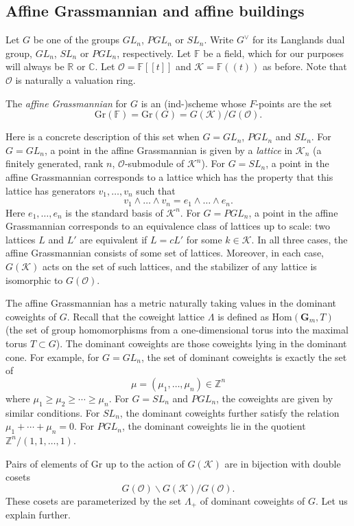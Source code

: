\documentclass[ALCO,ThmDefs,Unicode,epreuves]{cedram}
\newcommand{\F}{\mathbb{F}}
\newcommand{\Z}{\mathbb{Z}}
\newcommand{\R}{\mathbb{R}}
\newcommand{\C}{\mathbb{C}}
\newcommand{\vG}{G^\vee}
\newcommand{\cO}{\mathcal{O}}
\newcommand{\cK}{\mathcal{K}}
\newcommand{\Gr}{\mathrm{Gr}}
\begin{document}
\subsection{Affine Grassmannian and affine buildings}

Let $G$ be one of the groups $GL_n$, $PGL_n$ or $SL_n$. Write $\vG$ for its Langlands dual group, $GL_n$, $SL_n$ or $PGL_n$, respectively. Let $\F$ be a field, which for our purposes will always be $\R$ or $\C$. Let $\cO=\F[[t]]$ and $\cK=\F((t))$ as before. Note that $\cO$ is naturally a valuation ring.


The \emph{affine Grassmannian} for $G$ is an (ind-)scheme whose $F$-points are the set
\[
\Gr(\F) = \Gr(G) = G(\cK)/G(\cO).
\]

Here is a concrete description of this set when $G=GL_n$, $PGL_n$ and $SL_n$. For $G=GL_n$, a point in the affine Grassmannian is given by a \emph{lattice} in $\cK_n$ (a finitely generated, rank $n$, $\cO$-submodule of $\cK^n$). For $G=SL_n$, a point in the affine Grassmannian corresponds to a lattice which has the property that this lattice has generators $v_1, \dots, v_n$ such that
\[
v_1 \wedge \dots \wedge v_n=e_1 \wedge \dots \wedge e_n.
\]
Here $e_1, \dots, e_n$ is the standard basis of $\cK^n$. For $G=PGL_n$, a point in the affine Grassmannian corresponds to an equivalence class of lattices up to scale: two lattices $L$ and $L'$ are equivalent if $L=cL'$ for some $k \in \cK$. In all three cases, the affine Grassmannian consists of some set of lattices. Moreover, in each case, $G(\cK)$ acts on the set of such lattices, and the stabilizer of any lattice is isomorphic to $G(\cO)$.

The affine Grassmannian has a metric naturally taking values in the dominant coweights of $G$. Recall that the coweight lattice $\Lambda$ is defined as $\mathrm{Hom}(\mathbf{G}_m,T)$ (the set of group homomorphisms from a one-dimensional torus into the maximal torus $T \subset G$). The dominant coweights are those coweights lying in the dominant cone. For example, for $G=GL_n$, the set of dominant coweights is exactly the set of 
\[
\mu=(\mu_1, \dots, \mu_n) \in \Z^n
\]
where $\mu_1 \geq \mu_2 \geq \cdots \geq \mu_n$. For $G=SL_n$ and $PGL_n$, the coweights are given by similar conditions. For $SL_n$, the dominant coweights further satisfy the relation $\mu_1+\cdots+\mu_n=0$. For $PGL_n$, the dominant coweights lie in the quotient $\Z^n/(1, 1, \dots, 1)$.

Pairs of elements of $\Gr$ up to the action of $G(\cK)$ are in bijection with double cosets 
\[
G(\cO) \backslash G(\cK) / G(\cO).
\]
 These cosets are parameterized by the set $\Lambda_+$ of dominant coweights of $G$. Let us explain further.
\end{document}
